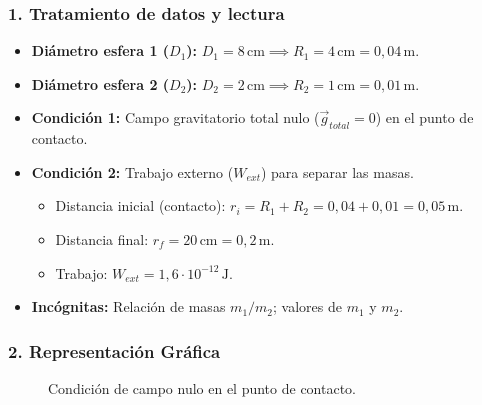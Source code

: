 \subsubsection*{1. Tratamiento de datos y lectura}
\begin{itemize}
    \item \textbf{Diámetro esfera 1 ($D_1$):} $D_1=8\,\text{cm} \implies R_1 = 4\,\text{cm} = 0,04\,\text{m}$.
    \item \textbf{Diámetro esfera 2 ($D_2$):} $D_2=2\,\text{cm} \implies R_2 = 1\,\text{cm} = 0,01\,\text{m}$.
    \item \textbf{Condición 1:} Campo gravitatorio total nulo ($\vec{g}_{total}=0$) en el punto de contacto.
    \item \textbf{Condición 2:} Trabajo externo ($W_{ext}$) para separar las masas.
    \begin{itemize}
        \item Distancia inicial (contacto): $r_i = R_1+R_2 = 0,04+0,01=0,05\,\text{m}$.
        \item Distancia final: $r_f = 20\,\text{cm} = 0,2\,\text{m}$.
        \item Trabajo: $W_{ext} = 1,6\cdot10^{-12}\,\text{J}$.
    \end{itemize}
    \item \textbf{Incógnitas:} Relación de masas $m_1/m_2$; valores de $m_1$ y $m_2$.
\end{itemize}

\subsubsection*{2. Representación Gráfica}
\begin{figure}[H]
    \centering
    \caption{Condición de campo nulo en el punto de contacto.}
\end{figure}

